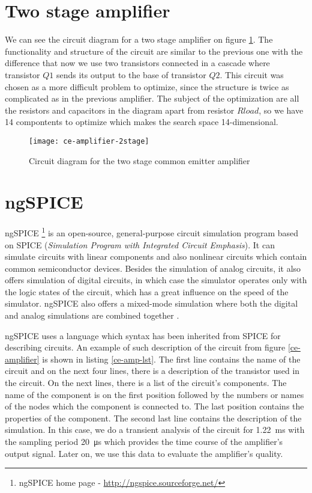 \section{Two stage amplifier}
We can see the circuit diagram for a two stage amplifier on figure \ref{ce-amplifier-2stage}. The functionality and structure of the circuit are similar to the previous one with the difference that now we use two transistors connected in a cascade where transistor $Q1$ sends its output to the base of transistor $Q2$. This circuit was chosen as a more difficult problem to optimize, since the structure is twice as complicated as in the previous amplifier. The subject of the optimization are all the resistors and capacitors in the diagram apart from resistor $Rload$, so we have 14 compontents to optimize which makes the search space 14-dimensional.

\begin{figure}[H]
    \centering
    \texttt{[image: ce-amplifier-2stage]} \label{ce-amplifier-2stage}
    \caption{Circuit diagram for the two stage common emitter amplifier}
\end{figure}

\section{ngSPICE}
ngSPICE \footnote{ngSPICE home page - \url{http://ngspice.sourceforge.net/}} is an open-source, general-purpose circuit simulation program based on SPICE (\textit{Simulation Program with Integrated Circuit Emphasis}). It can simulate circuits with linear components and also nonlinear circuits which contain common semiconductor devices. Besides the simulation of analog circuits, it also offers simulation of digital circuits, in which case the simulator operates only with the logic states of the circuit, which has a great influence on the speed of the simulator. ngSPICE also offers a mixed-mode simulation where both the digital and analog simulations are combined together \cite{ngSPICE-manual}.

ngSPICE uses a language which syntax has been inherited from SPICE for describing circuits. An example of such description of the circuit from figure \ref{ce-amplifier} is shown in listing \ref{ce-amp-lst}. The first line contains the name of the circuit and on the next four lines, there is a description of the transistor used in the circuit. On the next lines, there is a list of the circuit's components. The name of the component is on the first position followed by the numbers or names of the nodes which the component is connected to. The last position contains the properties of the component. The second last line contains the description of the simulation. In this case, we do a transient analysis of the circuit for \SI{1.22}{\milli\second} with the sampling period \SI{20}{\micro\second} which provides the time course of the amplifier's output signal. Later on, we use this data to evaluate the amplifier's quality.

